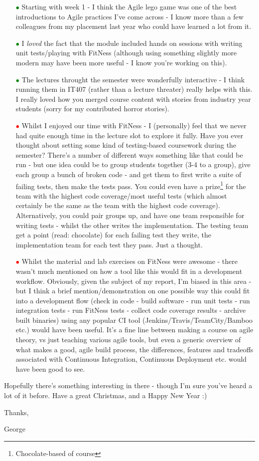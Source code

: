 \begin{itemize}
  \item[\textcolor{green}{$\bullet$}] Starting with week 1 - I think the Agile
  lego game was one of the best introductions to Agile practices I've come
  across - I know more than a few colleagues from my placement last year who
  could have learned a lot from it.
  \item[\textcolor{green}{$\bullet$}] I \emph{loved} the fact that the module
  included hands on sessions with writing unit tests/playing with FitNess (although
  using something slightly more modern may have been more useful - I know you're working
  on this).
  \item[\textcolor{green}{$\bullet$}] The lectures throught the semester were
  wonderfully interactive - I think running them in IT407 (rather than a lecture
  threater) really helps with this. I really loved how you merged course content
  with stories from industry year students (sorry for my contributed horror stories).
  \item[\textcolor{red}{$\bullet$}] Whilst I enjoyed our time with FitNess - I
  (personally) feel that we never had quite enough time in the lecture slot to
  explore it fully. Have you ever thought about setting some kind of testing-based
  coursework during the semester? There's a number of different ways something
  like that could be run - but one idea could be to group students together (3-4
  to a group), give each group a bunch of broken code - and get them to first
  write a suite of failing tests, then make the tests pass. You could even have
  a prize\footnote{Chocolate-based of course} for the team with the highest
  code coverage/most useful tests (which almost certainly be the same as the team
  with the highest code coverage). Alternatively, you could pair groups up, and
  have one team responsible for writing tests - whilst the other writes the
  implementation. The testing team get a point (read: chocolate) for each failing
  test they write, the implementation team for each test they pass. Just a thought.
  \item[\textcolor{red}{$\bullet$}] Whilst the material and lab exercises on
  FitNess were awesome - there wasn't much mentioned on how a tool like this
  would fit in a development workflow. Obviously, given the subject of my report,
  I'm biased in this area - but I think a brief mention/demonstration on one
  possible way this could fit into a development flow (check in code - build
  software - run unit tests - run integration tests - run FitNess tests -
  collect code coverage results - archive built binaries) using any popular CI
  tool (Jenkins/Travis/TeamCity/Bamboo etc.) would have been useful. It's a fine
  line between making a course on agile theory, vs just teaching various agile tools,
  but even a generic overview of what makes a good, agile build process, the
  differences, features and tradeoffs associated with Continuous Integration,
  Continuous Deployment etc. would have been good to see.
\end{itemize}

Hopefully there's something interesting in there - though I'm sure you've heard
a lot of it before. Have a great Christmas, and a Happy New Year :)


Thanks,


George
